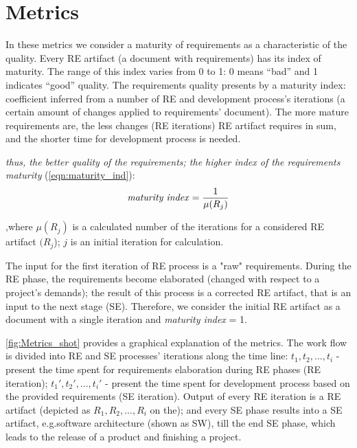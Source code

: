 \section{Metrics}
\label{sec:Solution} 


In these metrics we consider a maturity of requirements as a characteristic of the quality.
Every RE artifact (a document with requirements) has its index of maturity. The range of this index varies from 0 to 1: 0 means ``bad'' and 1 indicates ``good'' quality.
The requirements quality presents by a maturity index: coefficient inferred from a number of RE and development process's iterations (a certain amount of changes applied to requirements' document).
The more mature requirements are, the less changes (RE iterations) RE artifact requires in sum, and the shorter time for development process is needed. 

\textsl{thus, the better quality of the requirements; the higher index of the requirements maturity} (\autoref{eqn:maturity_ind}):
  \begin{equation}\label{eqn:maturity_ind}
\textrm{\textit{maturity index}} = \frac{1}{\mu(R_{j})}
	\end{equation}

,where $\mu(R_{j})$ is a calculated number of the iterations for a considered RE artifact $(R_{j}$); $j$ is an initial iteration for calculation.

The input for the first iteration of RE process is a "raw" requirements. During the RE phase, the requirements become elaborated (changed with respect to a project's demands); the result of this process is a corrected RE artifact, that is an input to the next stage (SE). Therefore, we consider the initial RE artifact as a document with a single iteration and \textit{maturity index} = 1. 
\newpage
\hfill \break

\vspace{5.5cm}

\autoref{fig:Metrics_shot} provides a graphical explanation of the metrics. The work flow is divided into RE and SE processes' iterations along the time line: $t_{1},t_{2},...,t_{i}$ - present the time spent for requirements elaboration during RE phases (RE iteration); $t_{1}',t_{2}',...,t_{i}'$ - present the time spent for development process based on the provided requirements (SE iteration).
Output of every RE iteration is a RE artifact (depicted as $R_{1},R_{2},...,R_{i}$ on the); and every SE phase results into a SE artifact, e.g.software architecture (shown as SW), till the end SE phase, which leads to the release of a product and finishing a project.  

